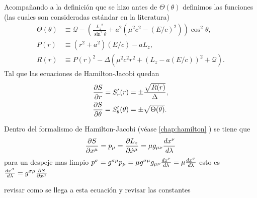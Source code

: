 Acompañando a la definición que se hizo antes de $\Theta(\theta)$ definimos las funciones (las cuales son consideradas estándar  en la literatura)
\begin{align}
    \Theta(\theta ) & \equiv \mathcal{Q} - \left(\frac{ {L_z}^2}{\sin ^2 \theta}+a^2(\mu^2 c^2  -  (E/c)^2) \right)\cos ^2 \theta, \\
    P(r)            & \equiv \left(r^2+a^2\right) (E/c) -a{L_z},                                                                   \\
    R(r)            & \equiv P(r)^2- \Delta(\mu^2 c^2 r^2 +({L_z}-a (E/c) )^2 +\mathcal{Q}).
\end{align}
Tal que las ecuaciones de Hamilton-Jacobi quedan
\begin{align}
    \frac{\partial S}{\partial r} = S_r^{\prime}(r)              & = \pm \frac{\sqrt{R(r)}}{\Delta}, \\
    \frac{\partial S}{\partial \theta}=S_\theta^{\prime}(\theta) & = \pm \sqrt{\Theta(\theta )}.
\end{align}

Dentro del formalismo de Hamilton-Jacobi (véase \ref{chap:hamilton} ) se tiene que
\begin{equation}
    \frac{\partial S}{\partial x^\mu} = p_\mu = \frac{\partial {L_z}}{\partial \dot{x}^\mu} = \mu g_{\mu \nu} \frac{d x^\nu}{d \lambda}
\end{equation}
para un despeje mas  limpio $p^\sigma = g^{\sigma \mu} p_\mu =\mu g^{\sigma \mu} g_{\mu \nu} \frac{d x^\nu}{d \lambda} = \mu \frac{d x^\sigma}{d \lambda}$ esto es $\frac{d x^\sigma}{d \lambda} = g^{\sigma \mu}\frac{\partial S}{\partial x^\mu}$
\begin{task}
    revisar como se llega a esta ecuación y revisar las constantes
\end{task}

